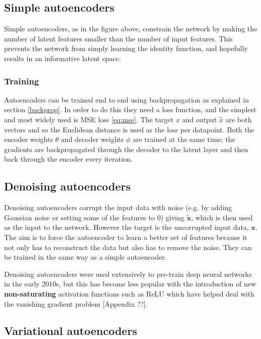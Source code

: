 \documentclass[12pt,a4paper,twoside,openright]{report}
\renewcommand{\vec}[1]{\bm{#1}}
\begin{document}
\subsection{Simple autoencoders}

Simple autoencoders, as in the figure above, constrain the network by making the number of latent features smaller than the number of input
features. This prevents the network from simply learning the identity function, and hopefully results in an informative latent space.

\subsubsection{Training}
Autoencoders can be trained end to end using backpropagation as explained in section \ref{backprop}. In order to do this they need a loss
function, and the simplest and most widely used is MSE loss \eqref{eq:mse}. The target $x$ and output $\hat{x}$ are both vectors and so 
the Euclidean distance is used as the loss per datapoint. Both the encoder weights $\theta$ and decoder weights $\phi$ are trained at the 
same time; the gradients are backpropagated through the decoder to the latent layer and then back through the encoder every iteration. 

\subsection{Denoising autoencoders}

Denoising autoencoders corrupt the input data with noise (e.g. by adding Gaussian noise or setting some of
the features to 0) giving $\tilde{\vec{x}}$, which is then used as the input to the network. However the target is the uncorrupted input data, 
$\vec{x}$. The aim is to force the autoencoder to learn a better set of features because it not only has to reconstruct the data but also 
has to remove the noise. They can be trained in the same way as a simple autoencoder.

Denoising autoencoders were used extensively to pre-train deep neural networks in the early 2010s, but this has become less popular with the 
introduction of new \textbf{non-saturating} activation functions such as ReLU which have helped deal with the vanishing gradient problem
[Appendix ??].

\subsection{Variational autoencoders} \label{vae}
\end{document}
